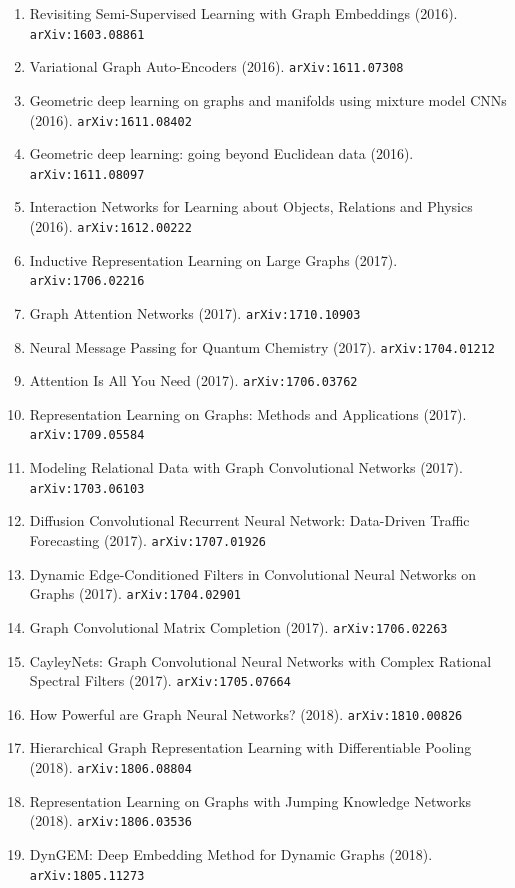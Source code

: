 \documentclass[11pt]{article}
\begin{document}
\begin{enumerate}
  \item Revisiting Semi-Supervised Learning with Graph Embeddings (2016). \texttt{arXiv:1603.08861}
  \item Variational Graph Auto-Encoders (2016). \texttt{arXiv:1611.07308}
  \item Geometric deep learning on graphs and manifolds using mixture model CNNs (2016). \texttt{arXiv:1611.08402}
  \item Geometric deep learning: going beyond Euclidean data (2016). \texttt{arXiv:1611.08097}
  \item Interaction Networks for Learning about Objects, Relations and Physics (2016). \texttt{arXiv:1612.00222}
  \item Inductive Representation Learning on Large Graphs (2017). \texttt{arXiv:1706.02216}
  \item Graph Attention Networks (2017). \texttt{arXiv:1710.10903}
  \item Neural Message Passing for Quantum Chemistry (2017). \texttt{arXiv:1704.01212}
  \item Attention Is All You Need (2017). \texttt{arXiv:1706.03762}
  \item Representation Learning on Graphs: Methods and Applications (2017). \texttt{arXiv:1709.05584}
  \item Modeling Relational Data with Graph Convolutional Networks (2017). \texttt{arXiv:1703.06103}
  \item Diffusion Convolutional Recurrent Neural Network: Data-Driven Traffic
  Forecasting (2017). \texttt{arXiv:1707.01926}
  \item Dynamic Edge-Conditioned Filters in Convolutional Neural Networks on
  Graphs (2017). \texttt{arXiv:1704.02901}
  \item Graph Convolutional Matrix Completion (2017). \texttt{arXiv:1706.02263}
  \item CayleyNets: Graph Convolutional Neural Networks with Complex Rational
  Spectral Filters (2017). \texttt{arXiv:1705.07664}
  \item How Powerful are Graph Neural Networks? (2018). \texttt{arXiv:1810.00826}
  \item Hierarchical Graph Representation Learning with Differentiable Pooling (2018). \texttt{arXiv:1806.08804}
  \item Representation Learning on Graphs with Jumping Knowledge Networks (2018). \texttt{arXiv:1806.03536}
  \item DynGEM: Deep Embedding Method for Dynamic Graphs (2018). \texttt{arXiv:1805.11273}

\end{enumerate}
\end{document}
